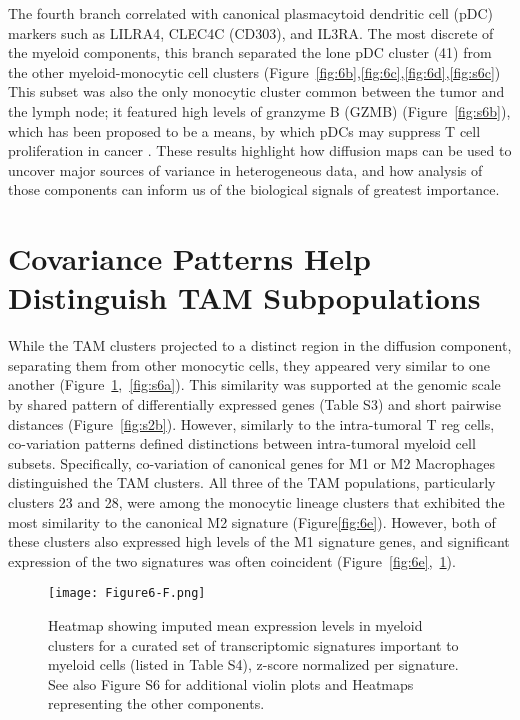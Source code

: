 The fourth branch correlated with canonical plasmacytoid dendritic cell (pDC) markers such as LILRA4, CLEC4C (CD303), and IL3RA\@.
The most discrete of the myeloid components, this branch separated the lone pDC cluster (41) from the other myeloid-monocytic cell clusters (Figure~\ref{fig:6b},\ref{fig:6c},\ref{fig:6d},\ref{fig:s6c}) This subset was also the only monocytic cluster common between the tumor and the lymph node; it featured high levels of granzyme B (GZMB) (Figure~\ref{fig:s6b}), which has been proposed to be a means, by which pDCs may suppress T cell proliferation in cancer \citep{Jahrsdoerfer2010,Swiecki2015}.
These results highlight how diffusion maps can be used to uncover major sources of variance in heterogeneous data, and how analysis of those components can inform us of the biological signals of greatest importance. 

\section{Covariance Patterns Help Distinguish TAM Subpopulations}

While the TAM clusters projected to a distinct region in the diffusion component, separating them from other monocytic cells, they appeared very similar to one another (Figure~\ref{fig:6f},~\ref{fig:s6a}).
This similarity was supported at the genomic scale by shared pattern of differentially expressed genes (Table S3) and short pairwise distances (Figure~\ref{fig:s2b}). %
However, similarly to the intra-tumoral T reg cells, co-variation patterns defined distinctions between intra-tumoral myeloid cell subsets.
Specifically, co-variation of canonical genes for M1 or M2 Macrophages distinguished the TAM clusters.
All three of the TAM populations, particularly clusters 23 and 28, were among the monocytic lineage clusters that exhibited the most similarity to the canonical M2 signature (Figure\ref{fig:6e}).
However, both of these clusters also expressed high levels of the M1 signature genes, and significant expression of the two signatures was often coincident (Figure~\ref{fig:6e},~\ref{fig:6f}).

\begin{figure}
\centering
\texttt{[image: Figure6-F.png]}
\caption{Heatmap showing imputed mean expression levels in myeloid clusters for a curated set of transcriptomic signatures important to myeloid cells (listed in Table S4), z-score normalized per signature.
See also Figure S6 for additional violin plots and Heatmaps representing the other components. %
}
\label{fig:6f}
\end{figure}

